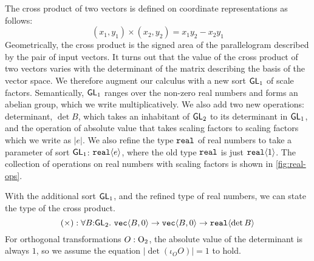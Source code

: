 The cross product of two vectors is defined on coordinate
representations as follows:
\begin{displaymath}
  (x_1,y_1) \times (x_2,y_2) = x_1y_2 - x_2y_1
\end{displaymath}
Geometrically, the cross product is the signed area of the
parallelogram described by the pair of input vectors. It turns out
that the value of the cross product of two vectors varies with the
determinant of the matrix describing the basis of the vector space. We
therefore augment our calculus with a new sort $\mathsf{GL}_1$ of scale
factors. Semantically, $\mathsf{GL}_1$ ranges over the non-zero real
numbers and forms an abelian group, which we write
multiplicatively. We also add two new operations: determinant, $\det
B$, which takes an inhabitant of $\mathsf{GL}_2$ to its determinant in
$\mathsf{GL}_1$, and the operation of absolute value that takes scaling
factors to scaling factors which we write as $|e|$. We also refine the
type $\texttt{real}$ of real numbers to take a parameter of sort
$\mathsf{GL}_1$: $\texttt{real}\langle e \rangle$, where the old type $\texttt{real}$
is just $\texttt{real}\langle 1 \rangle$. The collection of operations on real
numbers with scaling factors is shown in \autoref{fig:real-ops}.

With the additional sort $\mathsf{GL}_1$, and the refined type of real
numbers, we can state the type of the cross product.
\begin{displaymath}
  (\times) : \forall B \mathord: \mathsf{GL}_2.\ \texttt{vec}\langle B,0 \rangle \to \texttt{vec}\langle B,0 \rangle \to \texttt{real}\langle \det B \rangle
\end{displaymath}
For orthogonal transformations $O : \mathrm{O}_2$, the absolute value of
the determinant is always $1$, so we assume the equation $|\det
(\iota_O O)| = 1$ to hold.

